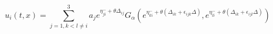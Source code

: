 \begin{equation}
 u_{i}(t,x)=\sum_{j = 1, k<l \neq i}^{3} a_{j}e^{\eta _{ji}^{-}+\theta
\Delta _{ij}}
G_{\alpha }\left(e^{\eta _{ki}^{-}+\theta\left( \Delta
_{ik} + \epsilon_{ijk} \Delta\right)}, e^{\eta_{li}^{-}+\theta\left( \Delta
_{ik} + \epsilon_{ijl} \Delta\right)}\right)
\label{sol1}
\end{equation}

